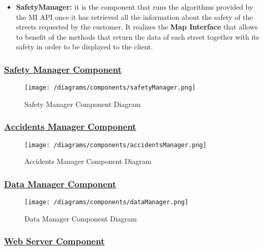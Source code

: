 			\begin{itemize}
				\item \textbf{SafetyManager:} it is the component that runs the algorithms provided by the MI API once it has retrieved all the information about the safety of the streets requested by the customer. It realizes the \textbf{Map Interface} that allows to benefit of the methods that return the data of each street together with its safety in order to be displayed to the client.
			\end{itemize}
		
		\subsubsection[Safety Manager Component]{\hyperlink{toc}{Safety Manager Component}}
			\label{sec:safetyManagerComponent}
			
			\begin{figure}[ht]
				\centering
				\texttt{[image: /diagrams/components/safetyManager.png]}
				\caption{\label{fig:safetyManagerComp} Safety Manager Component Diagram}
			\end{figure}
		
		\subsubsection[Accidents Manager Component]{\hyperlink{toc}{Accidents Manager Component}}
			\label{sec:accidentsManagerComponent}
			
			\begin{figure}[ht]
				\centering
				\texttt{[image: /diagrams/components/accidentsManager.png]}
				\caption{\label{fig:accidentsManagerComp} Accidents Manager Component Diagram}
			\end{figure}
		
		\subsubsection[Data Manager Component]{\hyperlink{toc}{Data Manager Component}}
			\label{sec:dataManagerComponent}
			
			\begin{figure}[ht]
				\centering
				\texttt{[image: /diagrams/components/dataManager.png]}
				\caption{\label{fig:dataManagerComp} Data Manager Component Diagram}
			\end{figure}
		
		\subsubsection[Web Server Component]{\hyperlink{toc}{Web Server Component}}
			\label{sec:webServerComponent}
			
